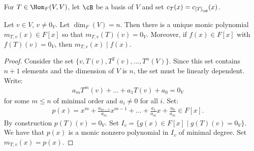     \begin{definition}
        For $T \in \Hom_F(V,V)$, let $\cB$ be a basis of $V$ and set $c_T(x) = c_{\left[T\right]_\cB}(x)$.
    \end{definition}

    \begin{theorem}
        Let $v \in V$, $v\neq 0_V$. Let $\dim_F(V) = n$. Then there is a unique monic polynomial $m_{T,v}(x) \in F[x]$ so that $m_{T,v}(T)(v) = 0_V$. Moreover, if $f(x) \in F[x]$ with $f(T)(v) = 0_V$, then $m_{T,v}(x) \mid f(x)$.
    \end{theorem}
        \begin{proof}
            Consider the set $\{v,T(v),T^2(v),...,T^n(V)\}$. Since this set contains $n+1$ elements and the dimension of $V$ is $n$, the set must be linearly dependent. Write:
                \begin{equation*}
                \begin{split}
                    a_mT^m(v) + ... + a_1T(v) + a_0 = 0_V
                \end{split}
                \end{equation*}
            for some $m \leq n$ of minimal order and $a_i \neq 0$ for all $i$. Set:
                \begin{equation*}
                \begin{split}
                    p(x) = x^m + \frac{a_{m-1}}{a_m}x^{m-1} + ... + \frac{a_{1}}{a_m}x + \frac{a_{0}}{a_m} \in F[x].
                \end{split}
                \end{equation*}
            By construction $p(T)(v) = 0_V$. Set $I_v = \{g(x) \in F[x] \mid g(T)(v) = 0_V \}$. We have that $p(x)$ is a monic nonzero polynomial in $I_v$ of minimal degree. Set $m_{T,v}(x) = p(x)$.


\end{proof}
